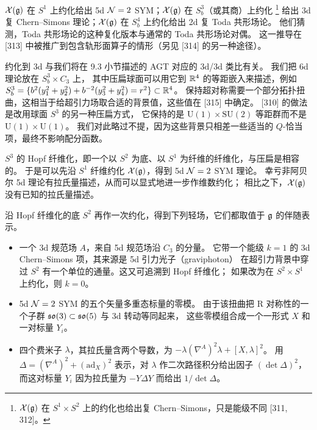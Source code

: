 
$\mathcal{X}(\mathfrak{g})$ 在 $S^1$ 上约化给出 5d $\mathcal{N}=2$ SYM；$\mathcal{X}(\mathfrak{g})$ 在 $S^3_b$（或其商）上约化
\footnote{$\mathcal{X}(\mathfrak{g})$ 在 $S^1\times S^2$ 上的约化也给出复 Chern--Simons，只是能级不同 [311, 312]。}
给出 3d 复 Chern--Simons 理论；$\mathcal{X}(\mathfrak{g})$ 在 $S^4_b$ 上约化给出 2d 复 Toda 共形场论。
他们猜测，Toda 共形场论的这种复化版本与通常的 Toda 共形场论对偶。
这一推导在 [313] 中被推广到包含轨形面算子的情形（另见 [314] 的另一种途径）。

约化到 3d 与我们将在 9.3 小节描述的 AGT 对应的 3d/3d 类比有关。
我们把 6d 理论放在 $S^3_b\times C_3$ 上，
其中压扁球面可以用它到 $\mathbb{R}^4$ 的等距嵌入来描述，例如
$S^3_b=\{b^2(y_1^2+y_2^2)+b^{-2}(y_3^2+y_4^2)=r^2\}\subset\mathbb{R}^4$。
保持超对称需要一个部分拓扑扭曲，这相当于给超引力场取合适的背景值，这些值在 [315] 中确定。
[310] 的做法是改用球面 $S^3$ 的另一种压扁方式，
它保持的是 $\mathrm{U}(1)\times\mathrm{SU}(2)$ 等距群而不是 $\mathrm{U}(1)\times\mathrm{U}(1)$。
我们对此略过不提，因为这些背景只相差一些适当的 $Q$-恰当项，最终不影响配分函数。

$S^3$ 的 Hopf 纤维化，即一个以 $S^2$ 为底、以 $S^1$ 为纤维的纤维化，与压扁是相容的。
于是可以先沿 $S^1$ 纤维约化 $\mathcal{X}(\mathfrak{g})$，得到 5d $\mathcal{N}=2$ SYM 理论。
幸亏非阿贝尔 5d 理论有拉氏量描述，从而可以显式地进一步作维数约化；
相比之下，$\mathcal{X}(\mathfrak{g})$ 没有已知的拉氏量描述。

沿 Hopf 纤维化的底 $S^2$ 再作一次约化，得到下列轻场，它们都取值于 $\mathfrak{g}$ 的伴随表示。
\begin{itemize}[leftmargin=1.5em,itemsep=2pt,topsep=2pt]
\item 一个 3d 规范场 $A$，来自 5d 规范场沿 $C_3$ 的分量。
它带一个能级 $k=1$ 的 3d Chern--Simons 项，其来源是 5d 引力光子（graviphoton）
在超引力背景中穿过 $S^2$ 有一个单位的通量。这又可追溯到 Hopf 纤维化；
如果改为在 $S^2\times S^1$ 上约化，则 $k=0$。
\item 5d $\mathcal{N}=2$ SYM 的五个矢量多重态标量的零模。
由于该扭曲把 R 对称性的一个子群 $\mathfrak{so}(3)\subset\mathfrak{so}(5)$ 与 3d 转动等同起来，
这些零模组合成一个一形式 $X$ 和一对标量 $Y_i$。
\item 四个费米子 $\lambda$，其拉氏量含两个导数，为 $-\lambda(\nabla^A)^2\lambda+[X,\lambda]^2$。
用 $\Delta=(\nabla^A)^2+(\mathrm{ad}_X)^2$ 表示，对 $\lambda$ 作二次路径积分给出因子 $(\det\Delta)^2$，
而这对标量 $Y_i$ 因为拉氏量为 $-Y\Delta Y$ 而给出 $1/\det\Delta$。
\end{itemize}

